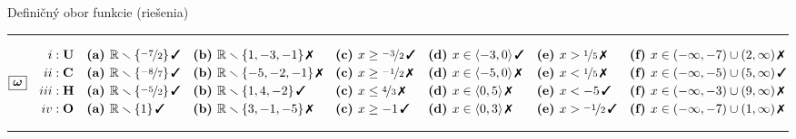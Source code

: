 \documentclass[10pt]{report}
\begin{document}
\begin{landscape}
\begin{center}{\huge Definičný obor funkcie (riešenia)}
\begin{varwidth}{\linewidth}
\begin{center}
\rule[1.3mm]{\linewidth}{0.5pt}
$\boxed{\bm{\omega}} \quad \begin{aligned}
\romannumeral1 : \; &\textbf{U} 
 &&\mathrm{\textbf{(a) }}  \mathbb{R} \smallsetminus\{\nicefrac{-7}{2} \}\,\text{\ding{51}}
 &&\mathrm{\textbf{(b) }}  \mathbb{R} \smallsetminus\{1,-3,-1 \}\,\text{\ding{55}}
 &&\mathrm{\textbf{(c) }} x\geq\nicefrac{-3}{2}\,\text{\ding{51}}
 &&\mathrm{\textbf{(d) }} x\in\langle-3 , 0\rangle\,\text{\ding{51}}
 &&\mathrm{\textbf{(e) }} x>\nicefrac{1}{5}\,\text{\ding{55}}
 &&\mathrm{\textbf{(f) }} x\in(-\infty , -7)\cup(2 , \infty)\,\text{\ding{55}}
\\[-0.2mm]
\romannumeral2 : \; &\textbf{C} 
 &&\mathrm{\textbf{(a) }}  \mathbb{R} \smallsetminus\{\nicefrac{-8}{7} \}\,\text{\ding{51}}
 &&\mathrm{\textbf{(b) }}  \mathbb{R} \smallsetminus\{-5,-2,-1 \}\,\text{\ding{55}}
 &&\mathrm{\textbf{(c) }} x\geq\nicefrac{-1}{2}\,\text{\ding{55}}
 &&\mathrm{\textbf{(d) }} x\in\langle-5 , 0\rangle\,\text{\ding{55}}
 &&\mathrm{\textbf{(e) }} x<\nicefrac{1}{5}\,\text{\ding{55}}
 &&\mathrm{\textbf{(f) }} x\in(-\infty , -5)\cup(5 , \infty)\,\text{\ding{51}}
\\[-0.2mm]
\romannumeral3 : \; &\textbf{H} 
 &&\mathrm{\textbf{(a) }}  \mathbb{R} \smallsetminus\{\nicefrac{-5}{2} \}\,\text{\ding{51}}
 &&\mathrm{\textbf{(b) }}  \mathbb{R} \smallsetminus\{1,4,-2 \}\,\text{\ding{51}}
 &&\mathrm{\textbf{(c) }} x\leq\nicefrac{4}{3}\,\text{\ding{55}}
 &&\mathrm{\textbf{(d) }} x\in\langle0 , 5\rangle\,\text{\ding{55}}
 &&\mathrm{\textbf{(e) }} x<-5\,\text{\ding{51}}
 &&\mathrm{\textbf{(f) }} x\in(-\infty , -3)\cup(9 , \infty)\,\text{\ding{55}}
\\[-0.2mm]
\romannumeral4 : \; &\textbf{O} 
 &&\mathrm{\textbf{(a) }}  \mathbb{R} \smallsetminus\{1 \}\,\text{\ding{51}}
 &&\mathrm{\textbf{(b) }}  \mathbb{R} \smallsetminus\{3,-1,-5 \}\,\text{\ding{55}}
 &&\mathrm{\textbf{(c) }} x\geq-1\,\text{\ding{51}}
 &&\mathrm{\textbf{(d) }} x\in\langle0 , 3\rangle\,\text{\ding{55}}
 &&\mathrm{\textbf{(e) }} x>\nicefrac{-1}{2}\,\text{\ding{51}}
 &&\mathrm{\textbf{(f) }} x\in(-\infty , -7)\cup(1 , \infty)\,\text{\ding{55}}
\end{aligned} $
\\[1mm]
\rule[-1mm]{\linewidth}{0.5pt}
\end{center}
\end{varwidth}
\end{center}
\end{landscape}
\end{document}
